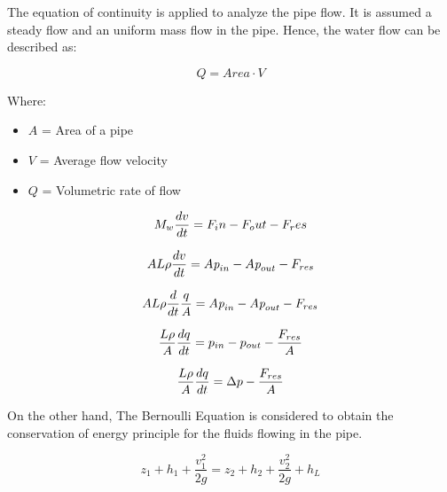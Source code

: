 The equation of continuity is applied to analyze the pipe flow. It is assumed a steady flow and an uniform 
mass flow in the pipe. Hence, the water flow can be described as: 

\begin{equation}
  Q=Area \cdot V
	\label{EquationOfContinuity}
\end{equation}

Where: 

\begin{itemize}
  \item  $A$ = Area of a pipe
  \item $V$ = Average flow velocity
  \item $Q$ = Volumetric rate of flow
\end{itemize}

\begin{equation}
  M_w \frac{dv}{dt} = F_in - F_out - F_res \\
\end{equation}

\begin{equation}
    A L \rho \frac{dv}{dt} = A \textit{p}_{in} - A \textit{p}_{out} - F_{res} \\
\end{equation}

\begin{equation}
    A L \rho \frac{d}{dt} \frac{q}{A} = A \textit{p}_{in} - A \textit{p}_{out} - F_{res} \\
\end{equation}

\begin{equation}
    \frac{L \rho}{A} \frac{dq}{dt} =p_{in} - p_{out} - \frac{ F_{res}}{A} \\
\end{equation}

\begin{equation}
    \frac{L \rho}{A} \frac{dq}{dt} =\Delta p - \frac{ F_{res}}{A} \\
\end{equation}


On the other hand, The Bernoulli Equation is considered to obtain the conservation of energy principle for the fluids flowing in the pipe.

\begin{equation}
  \label{Bernoulliequation}
z_1 + h_1 + \frac{v_1^{2}}{2g} = z_2 + h_2 + \frac{v_2^{2}}{2g} + h_L
\end{equation}

